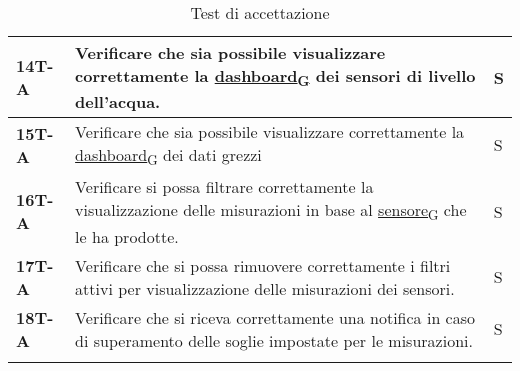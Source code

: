 \begin{longtable}{|>{\raggedright\arraybackslash}m{}|>{\raggedright\arraybackslash}m{}|>{\raggedright\arraybackslash}m{}|}
	\hline
	\textbf{14T-A}  & Verificare che sia possibile visualizzare correttamente la \href{https://7last.github.io/docs/pb/documentazione-interna/glossario\#dashboard}{dashboard\textsubscript{G}} dei sensori di livello dell'acqua.                                                                                                    & S              \\
	\hline
	\textbf{15T-A}  & Verificare che sia possibile visualizzare correttamente la \href{https://7last.github.io/docs/pb/documentazione-interna/glossario\#dashboard}{dashboard\textsubscript{G}} dei dati grezzi                                                                                                                       & S              \\
	\hline
	\textbf{16T-A}  & Verificare si possa filtrare correttamente la visualizzazione delle misurazioni in base al \href{https://7last.github.io/docs/pb/documentazione-interna/glossario\#sensore}{sensore\textsubscript{G}} che le ha prodotte.                                                                                       & S              \\
	\hline
	\textbf{17T-A}  & Verificare che si possa rimuovere correttamente i filtri attivi per visualizzazione delle misurazioni dei sensori.                                                                                                                                                                                              & S              \\
	\hline
	\textbf{18T-A}  & Verificare che si riceva correttamente una notifica in caso di superamento delle soglie impostate per le misurazioni.                                                                                                                                                                                           & S              \\
	\hline
	\caption{Test di accettazione}
\end{longtable}
